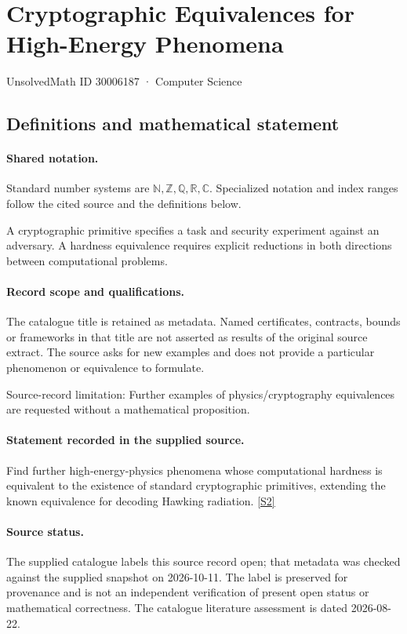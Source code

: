 \documentclass[11pt]{article}
\newcommand{\sref}[2]{\hyperlink{source:#1:#2}{[S#2]}}
\begin{document}
\setcounter{section}{30006186}
\section{Cryptographic Equivalences for High-Energy Phenomena}\label{30006187}
{\small\sffamily UnsolvedMath ID 30006187 · Computer Science}
\subsection{Definitions and mathematical statement}

\paragraph{Shared notation.}Standard number systems are $\mathbb N,\mathbb Z,\mathbb Q,\mathbb R,\mathbb C$. Specialized notation and index ranges follow the cited source and the definitions below.


A cryptographic primitive specifies a task and security experiment against an adversary. A hardness equivalence requires explicit reductions in both directions between computational problems.
\paragraph{Record scope and qualifications.}
The catalogue title is retained as metadata. Named certificates, contracts, bounds or frameworks in that title are not asserted as results of the original source extract.
The source asks for new examples and does not provide a particular phenomenon or equivalence to formulate.

Source-record limitation: Further examples of physics/cryptography equivalences are requested without a mathematical proposition.
\paragraph{Statement recorded in the supplied source.}
Find further high-energy-physics phenomena whose computational hardness is equivalent to the existence of standard cryptographic primitives, extending the known equivalence for decoding Hawking radiation. \sref{30006187}{2}
\paragraph{Source status.}
The supplied catalogue labels this source record open; that metadata was checked against the supplied snapshot on 2026-10-11. The label is preserved for provenance and is not an independent verification of present open status or mathematical correctness. The catalogue literature assessment is dated 2026-08-22.
\end{document}
